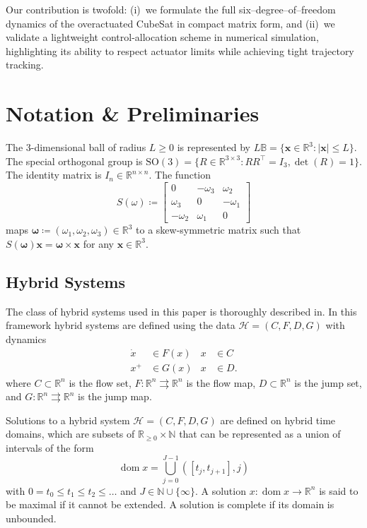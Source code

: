 \documentclass[journal]{IEEEtran}
\newcommand{\norm}[1]{\left| #1 \right|}
\newcommand{\tp}{^\top}
\newcommand{\ball}{\mathbb{B}}
\newcommand{\eye}[1]{I_{#1}}
\DeclareMathOperator{\dom}{dom}
\begin{document}
Our contribution is twofold: (i)~we formulate the full six--degree--of--freedom dynamics of the overactuated CubeSat in compact matrix form, and (ii)~we validate a lightweight control-allocation scheme in numerical simulation, highlighting its ability to respect actuator limits while achieving tight trajectory tracking.


\section{Notation \& Preliminaries}
The 3-dimensional ball of radius $L\geq 0$ is represented by $L\ball = \{\bm{x}\in\mathbb{R}^3:\norm{\bm{x}}\leq L\}$. The special orthogonal group is $\mathrm{SO}(3) = \{R\in\mathbb{R}^{3\times3}:RR\tp=\eye{3}, \det(R)=1\}$. The identity matrix is $\eye{n}\in\mathbb{R}^{n\times n}$. 
The function 
\begin{equation}\label{eq:S}
S(\omega)\coloneqq\begin{bmatrix}
0 & -\omega_3 & \omega_2\\
\omega_3 & 0 & -\omega_1\\
-\omega_2 & \omega_1 & 0
\end{bmatrix}
\end{equation}
maps $\bm{\omega}\coloneqq(\omega_1,\omega_2,\omega_3)\in\mathbb{R}^3$ to a skew-symmetric matrix such that $S(\bm{\omega})\bm{x} = \bm{\omega}\times\bm{x}$ for any $\bm{x}\in\mathbb{R}^3$.

\subsection{Hybrid Systems}

The class of hybrid systems used in this paper is thoroughly described in\cite{goebel_hybrid_2012}. In this framework hybrid systems are defined using the data $\mathcal{H}=(C,F,D,G)$ with dynamics
\begin{align*}
  \dot{x} &\in F(x) & x &\in C\\
  x^+ &\in G(x) & x &\in D.
\end{align*}
where $C\subset\mathbb{R}^n$ is the flow set, $F:\mathbb{R}^n\rightrightarrows\mathbb{R}^n$ is the flow map, $D\subset\mathbb{R}^n$ is the jump set, and $G:\mathbb{R}^n\rightrightarrows\mathbb{R}^n$ is the jump map.

Solutions to a hybrid system $\mathcal{H}=(C,F,D,G)$ are defined on hybrid time domains, which are subsets of $\mathbb{R}_{\geq 0}\times\mathbb{N}$ that can be represented as a union of intervals of the form
$$\dom x = \bigcup_{j=0}^{J-1} ([t_j,t_{j+1}],j)$$
with $0=t_0\leq t_1\leq t_2\leq\ldots$ and $J\in\mathbb{N}\cup\{\infty\}$. A solution $x:\dom x\to\mathbb{R}^n$ is said to be maximal if it cannot be extended. A solution is complete if its domain is unbounded. 
\end{document}
